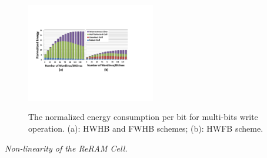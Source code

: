 \begin{figure}%
\centering
  \includegraphics[width=0.5\textwidth]{./figures/multi_energy_f.pdf}\\
  \caption{The normalized energy consumption per bit for multi-bits write operation. (a): HWHB and  FWHB schemes; (b): HWFB scheme. }\label{fig:multi_energy}
    \vspace{-10pt}
\end{figure}




\vspace{6pt} \emph{Non-linearity of the ReRAM Cell.} \vspace{6pt}

